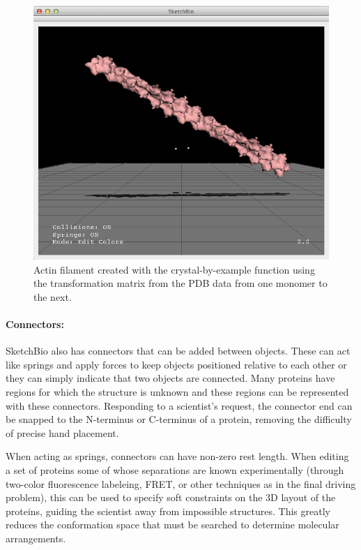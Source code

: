\documentclass[twocolumn]{bmcart}%
\begin{document}
\begin{figure}[h]
\centering
\includegraphics[width=0.9\columnwidth]{crystal_actin.png}
\caption{Actin filament created with the crystal-by-example function using the transformation matrix from the PDB data from one monomer to the next.}
\label{fig:crystal_actin}
\end{figure}


\paragraph*{Connectors:}
SketchBio also has connectors that can be added between objects.
These can act like springs and apply forces to keep objects positioned relative to each other or they can simply indicate that two objects are connected.
Many proteins have regions for which the structure is unknown and these regions can be represented with these connectors.
Responding to a scientist's request, the connector end can be snapped to the N-terminus or C-terminus of a protein, removing the difficulty of precise hand placement.

When acting as springs, connectors can have non-zero rest length.
When editing a set of proteins some of whose separations are known experimentally (through two-color fluorescence labeleing, FRET, or other techniques as in the final driving problem), this can be used to specify soft constraints on the 3D layout of the proteins, guiding the scientist away from impossible structures. This greatly reduces the conformation space that must be searched to determine molecular arrangements.
\end{document}
